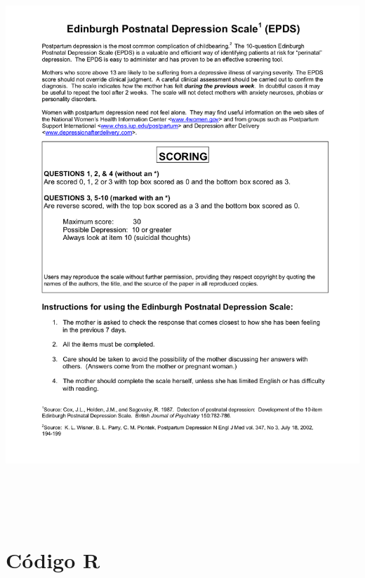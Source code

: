 \documentclass[twoside]{report}
\begin{document}
\begin{center}
	\hspace*{-2.1cm}
 	\includegraphics[width=18cm,height=21.2cm]{Figure2.png}
\end{center}

\chapter{Código R}


\newpage
\thispagestyle{empty}
\mbox{}
\end{document}
